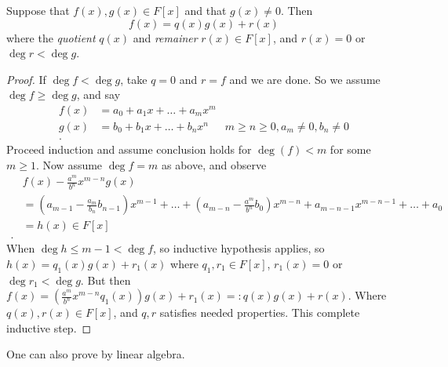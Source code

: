 \begin{theorem}
	Suppose that $f(x), g(x) \in F[x]$ and that $g(x) \neq 0$. Then
	\[
		f(x) = q(x)g(x) + r(x)
	\] 
	where the \textit{quotient} $q(x)$ and \textit{remainer} $r(x) \in F[x]$, and $r(x) = 0$ or  $\operatorname{deg} r < \operatorname{deg} g$.
\end{theorem}
\begin{proof}
	If $\operatorname{deg} f < \operatorname{deg} g$, take $q = 0$ and $r = f$ and we are done. So we assume $\operatorname{deg} f\ge \operatorname{deg} g$, and say
	\begin{align*}
		f(x)&= a_0+a_1x + \ldots+a_mx^m \\
		g(x)&= b_0+b_1x+\ldots+b_nx^n & m\ge n\ge 0, a_m \neq 0, b_n\neq 0\\
	.\end{align*}
	Proceed induction and assume conclusion holds for $\operatorname{deg} (f) < m$ for some $m\ge 1$. Now assume $\operatorname{deg} f = m$ as above, and observe
	\begin{align*}
		&f(x) - \frac{a^m}{b^n}x^{m-n}g(x) \\
		&= \left( a_{m-1} - \frac{a_m}{b_n}b_{n-1 } \right) x^{m-1} + \ldots+ \left( a_{m-n}- \frac{a^m}{b^n}b_0 \right) x^{m-n }+ a_{m-n-1 }x^{m-n-1 } + \ldots + a_0 \\
		&= h(x) \in F[x] \\
	.\end{align*} 
	When $\operatorname{deg} h \le m-1<\operatorname{deg} f$, so inductive hypothesis applies, so $h(x) = q_1(x) g(x) + r_1(x)$ where $q_1, r_1 \in F[x]$, $r_1(x) = 0$ or $\operatorname{deg} r_1 < \operatorname{deg} g$.
	But then $f(x)= \left( \frac{a^m}{b^n}x^{m-n}q_1(x) \right)  g(x) + r_1(x) =: q(x)g(x) + r(x)$.
	Where $q(x), r(x) \in F[x]$, and $q, r$ satisfies needed properties. This complete inductive step.
\end{proof}
\begin{remark}
	One can also prove by linear algebra.
\end{remark}

